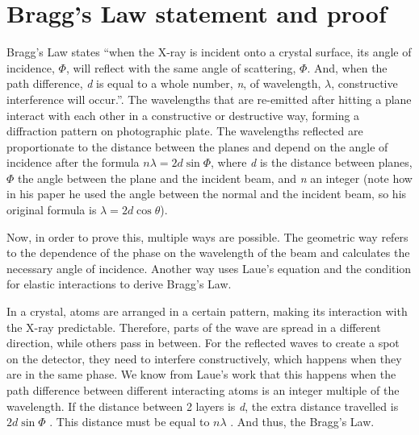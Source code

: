 \documentclass[14pt]{article}
\begin{document}
\section{Bragg’s Law statement and proof}

\cite{Bragg} Bragg's Law states “when the X-ray is incident onto a crystal surface, its angle of incidence, $\Phi$, will reflect with the same angle of scattering, $\Phi$. And, when the path difference, \textit{d} is equal to a whole number, \textit{n}, of wavelength, $\lambda$, constructive interference will occur.”. The wavelengths that are re-emitted after hitting a plane interact with each other in a constructive or destructive way, forming a diffraction pattern on photographic plate. The wavelengths reflected are proportionate to the distance between the planes and depend on the angle of incidence after the formula $n\lambda=2d\sin{\Phi}$, where \textit{d} is the distance between planes, $\Phi$ the angle between the plane and the incident beam, and \textit{n} an integer (note how in his paper he used the angle between the normal and the incident beam, so his original formula is $\lambda=2d\cos{\theta}$).

Now, in order to prove this, multiple ways are possible. The geometric way refers to the dependence of the phase on the wavelength of the beam and calculates the necessary angle of incidence. Another way uses Laue’s equation and the condition for elastic interactions to derive Bragg’s Law.

In a crystal, atoms are arranged in a certain pattern, making its interaction with the X-ray predictable. Therefore, parts of the wave are spread in a different direction, while others pass in between. For the reflected waves to create a spot on the detector, they need to interfere constructively, which happens when they are in the same phase. We know from Laue's work\cite{Laue} that this happens when the path difference between different interacting atoms is an integer multiple of the wavelength. If the distance between 2 layers is \textit{d}, the extra distance travelled is $2d\sin{\Phi}$ . This distance must be equal to $n\lambda$ . And thus, the Bragg's Law.
\end{document}
